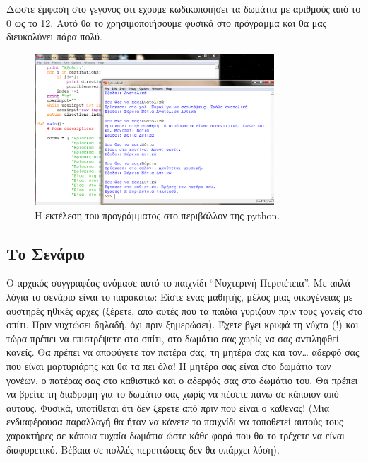 Δώστε έμφαση στο γεγονός ότι έχουμε κωδικοποιήσει τα δωμάτια με αριθμούς από
το 0 ως το 12. Αυτό θα το χρησιμοποιήσουμε φυσικά στο πρόγραμμα και θα μας
διευκολύνει πάρα πολύ.
%
\begin{figure}
  \centering
  \includegraphics[width=0.8\textwidth]{images/chapter2/py-adventure-run}
  \caption[Εκτέλεση του Adventure]{Η εκτέλεση του προγράμματος στο περιβάλλον της python.}
  \label{2-4}
\end{figure}
%
\subsection{Το Σενάριο}
%
Ο αρχικός συγγραφέας ονόμασε αυτό το παιχνίδι ``Νυχτερινή Περιπέτεια''. Με
απλά λόγια το σενάριο είναι το παρακάτω: Είστε ένας μαθητής, μέλος μιας
οικογένειας με αυστηρές ηθικές αρχές (ξέρετε, από αυτές που τα παιδιά
γυρίζουν πριν τους γονείς στο σπίτι. Πριν νυχτώσει δηλαδή, όχι πριν
ξημερώσει).  Έχετε βγει κρυφά τη νύχτα (!) και τώρα πρέπει να επιστρέψετε
στο σπίτι, στο δωμάτιο σας χωρίς να σας αντιληφθεί κανείς. Θα πρέπει να
αποφύγετε τον πατέρα σας, τη μητέρα σας και τον\ldots{} αδερφό σας που είναι
μαρτυριάρης και θα τα πει όλα! Η μητέρα σας είναι στο δωμάτιο των γονέων, ο
πατέρας σας στο καθιστικό και ο αδερφός σας στο δωμάτιο του. Θα πρέπει να
βρείτε τη διαδρομή για το δωμάτιο σας χωρίς να πέσετε πάνω σε κάποιον από
αυτούς. Φυσικά, υποτίθεται ότι δεν ξέρετε από πριν που είναι ο καθένας! (Μια
ενδιαφέρουσα παραλλαγή θα ήταν να κάνετε το παιχνίδι να τοποθετεί αυτούς
τους χαρακτήρες σε κάποια τυχαία δωμάτια ώστε κάθε φορά που θα το τρέχετε να
είναι διαφορετικό. Βέβαια σε πολλές περιπτώσεις δεν θα υπάρχει  λύση).


